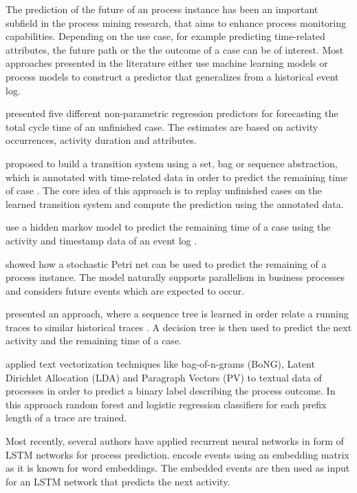 
The prediction of the future of an process instance has been an important subfield in the process mining research, that aims to enhance process monitoring capabilities.
Depending on the use case, for example predicting time-related attributes, the future path or the the outcome of a case can be of interest.
Most approaches presented in the literature either use machine learning models or process models to construct a predictor that generalizes from a historical event log.

 presented five different non-parametric regression predictors for forecasting the total cycle time of an unfinished case\cite{DBLP:conf/otm/DongenCA08}.
The estimates are based on activity occurrences, activity duration and attributes.

 proposed to build a transition system using a set, bag or sequence abstraction, which is annotated with time-related data in order to predict the remaining time of case \cite{DBLP:journals/is/AalstSS11}.
The core idea of this approach is to replay unfinished cases on the learned transition system and compute the prediction using the annotated data.

\citeauthor{DBLP:conf/colcom/PandeyNC11} use a hidden markov model to predict the remaining time of a case using the activity and timestamp data of an event log \cite{DBLP:conf/colcom/PandeyNC11}.

\citeauthor{DBLP:conf/icsoc/Rogge-SoltiW13} showed how a stochastic Petri net can be used to predict the remaining of a process instance.
The model naturally supports parallelism in business processes and considers future events which are expected to occur. 

\citeauthor{DBLP:conf/dis/CeciLFCM14} presented an approach, where a sequence tree is learned in order relate a running traces to similar historical traces \cite{DBLP:conf/dis/CeciLFCM14}.
A decision tree is then used to predict the next activity and the remaining time of a case.

\citeauthor{DBLP:conf/bpm/TeinemaaDMF16} applied text vectorization techniques like bag-of-n-grams (BoNG), Latent Dirichlet Allocation (LDA) and Paragraph Vectors (PV) to textual data of processes in order to predict a binary label describing the process outcome\cite{DBLP:conf/bpm/TeinemaaDMF16}.
In this approach random forest and logistic regression classifiers for each prefix length of a trace are trained.

Most recently, several authors have applied recurrent neural networks in form of LSTM networks for process prediction. \citeauthor{ DBLP:conf/bpm/EvermannRF16} encode events using an embedding matrix as it is known for word embeddings. The embedded events are then used as input for an LSTM network that predicts the next activity\cite{DBLP:conf/bpm/EvermannRF16}.


